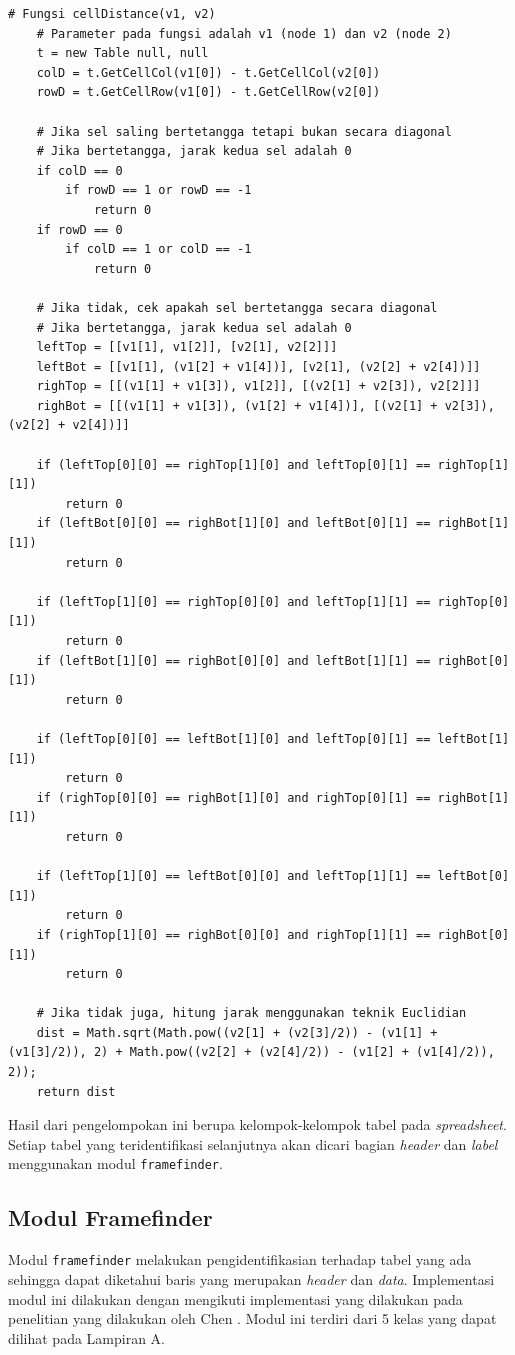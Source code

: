 \begin{lstlisting}[frame=single, basicstyle=\linespread{1}\scriptsize\listingsfont, captionpos=b, caption={Perhitungan Jarak \textit{Node}}, label=KodeJarak]
	# Fungsi cellDistance(v1, v2)
	# Parameter pada fungsi adalah v1 (node 1) dan v2 (node 2)
	t = new Table null, null
	colD = t.GetCellCol(v1[0]) - t.GetCellCol(v2[0])
	rowD = t.GetCellRow(v1[0]) - t.GetCellRow(v2[0])

	# Jika sel saling bertetangga tetapi bukan secara diagonal
	# Jika bertetangga, jarak kedua sel adalah 0
	if colD == 0
		if rowD == 1 or rowD == -1
			return 0
	if rowD == 0
		if colD == 1 or colD == -1
			return 0

	# Jika tidak, cek apakah sel bertetangga secara diagonal
	# Jika bertetangga, jarak kedua sel adalah 0
	leftTop = [[v1[1], v1[2]], [v2[1], v2[2]]]
	leftBot = [[v1[1], (v1[2] + v1[4])], [v2[1], (v2[2] + v2[4])]]
	righTop = [[(v1[1] + v1[3]), v1[2]], [(v2[1] + v2[3]), v2[2]]]
	righBot = [[(v1[1] + v1[3]), (v1[2] + v1[4])], [(v2[1] + v2[3]), (v2[2] + v2[4])]]

	if (leftTop[0][0] == righTop[1][0] and leftTop[0][1] == righTop[1][1])
		return 0
	if (leftBot[0][0] == righBot[1][0] and leftBot[0][1] == righBot[1][1])
		return 0

	if (leftTop[1][0] == righTop[0][0] and leftTop[1][1] == righTop[0][1])
		return 0
	if (leftBot[1][0] == righBot[0][0] and leftBot[1][1] == righBot[0][1])
		return 0

	if (leftTop[0][0] == leftBot[1][0] and leftTop[0][1] == leftBot[1][1])
		return 0
	if (righTop[0][0] == righBot[1][0] and righTop[0][1] == righBot[1][1])
		return 0

	if (leftTop[1][0] == leftBot[0][0] and leftTop[1][1] == leftBot[0][1])
		return 0
	if (righTop[1][0] == righBot[0][0] and righTop[1][1] == righBot[0][1])
		return 0

	# Jika tidak juga, hitung jarak menggunakan teknik Euclidian
	dist = Math.sqrt(Math.pow((v2[1] + (v2[3]/2)) - (v1[1] + (v1[3]/2)), 2) + Math.pow((v2[2] + (v2[4]/2)) - (v1[2] + (v1[4]/2)), 2));
	return dist
	\end{lstlisting}

Hasil dari pengelompokan ini berupa kelompok-kelompok tabel pada \textit{spreadsheet}. Setiap tabel yang teridentifikasi selanjutnya akan dicari bagian \textit{header} dan \textit{label} menggunakan modul \texttt{framefinder}.

\subsection{Modul Framefinder}
Modul \texttt{framefinder} melakukan pengidentifikasian terhadap tabel yang ada sehingga dapat diketahui baris yang merupakan \textit{header} dan \textit{data}. Implementasi modul ini dilakukan dengan mengikuti implementasi yang dilakukan pada penelitian yang dilakukan oleh Chen \citep{Chen2013}. Modul ini terdiri dari 5 kelas yang dapat dilihat pada Lampiran A.

